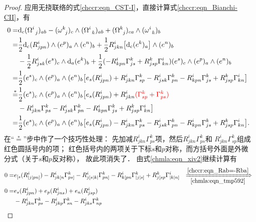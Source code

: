 \begin{proof}
    应用无挠联络的式\eqref{chccr:eqn_CST-I}，直接计算式\eqref{chccr:eqn_Bianchi-CII}，有
    \begin{align*}
        0=&  {\rm d}_c (\Omega_{\hphantom{a} j} ^{i})_{ab} -  ( \omega _{\hphantom{a} j}^k )_c
        \wedge (\Omega_{\hphantom{a} k} ^{i})_{ab} + (\Omega_{\hphantom{a} j} ^{k})_{ca}\wedge
        ( \omega _{\hphantom{a} k}^i )_b  \\
        =& \frac{1}{2}{\rm d}_c (R_{jpn}^i) \wedge (e^p)_a \wedge (e^n)_b +
        \frac{1}{2}R_{jkn}^i \bigl[{\rm d}_c(e^k)_a\bigr] \wedge (e^n)_b \\
        & -\frac{1}{2}R_{jsk}^i (e^s)_c\wedge {\rm d}_a (e^k)_b
        +\frac{1}{2}(-R_{kpn}^i \Gamma _{js}^k +  R_{jsp}^k \Gamma _{kn}^i )
        (e^s)_c \wedge (e^p)_a \wedge (e^n)_b \\
        =& \frac{1}{2} (e^s)_c\wedge (e^p)_a \wedge (e^n)_b  \big[ e_s (R_{jpn}^i)
        +R_{jkn}^i \Gamma_{sp}^k  - R_{jsk}^i \Gamma_{pn}^k
        -R_{kpn}^i \Gamma _{js}^k +  R_{jsp}^k \Gamma _{kn}^i \big] \\
        \overset{*}{=}&
        \frac{1}{2} (e^s)_c\wedge (e^p)_a \wedge (e^n)_b  \big[ e_s (R_{jpn}^i)
        +R_{jkn}^i {\color{red}(\Gamma_{sp}^k +\Gamma_{ps}^k) } \\
        &-R_{jkn}^i\Gamma_{ps}^k - R_{jsk}^i \Gamma_{pn}^k
        -R_{kpn}^i \Gamma_{js}^k +  R_{jsp}^k \Gamma _{kn}^i \big]     \\
        =& \frac{1}{2} (e^s)_c\wedge (e^p)_a \wedge (e^n)_b  \big[ e_s (R_{jpn}^i)
        -R_{jkn}^i \Gamma_{ps}^k  - R_{jsk}^i \Gamma_{pn}^k
        -R_{kpn}^i \Gamma _{js}^k +  R_{jsp}^k \Gamma _{kn}^i \big] .
    \end{align*}
    在“$\overset{*}{=}$”步中作了一个技巧性处理：
    先加减$R_{jkn}^i\Gamma_{ps}^k$项，然后$R_{jkn}^i\Gamma_{ps}^k$和
    $R_{jkn}^i\Gamma_{sp}^k$组成红色圆括号内的项；
    红色括号内的两项关于下标$s$和$p$对称，而方括号外面是外微分式（关于$s$和$p$反对称），
    故此项消失了．    由式\eqref{chmla:eqn_xiv2}继续计算有
    \begin{align*}
        0 =&  e_{[s} (R_{|j|pn]}^i)
        -R_{ jk[n}^i \Gamma_{ps]}^k - R_{ j[s|k|}^i \Gamma_{pn]}^k
        -R_{ k[pn}^i \Gamma_{|j|s]}^k + R_{ j[sp}^k \Gamma_{|k|n]}^i
        \quad {\xRightarrow[\ref{chmla:eqn_tmp592}]{\ref{chccr:eqn_Rab=-Rba}}}\\
        0=&  e_{s} (R_{jpn}^i) +e_{p} (R_{jns}^i)  +e_{n} (R_{jsp}^i)  \\
        & -R_{jkn}^i \Gamma_{ps}^k -R_{jkp}^i \Gamma_{sn}^k -R_{jks}^i \Gamma_{np}^k

\end{align*}
\end{proof}
